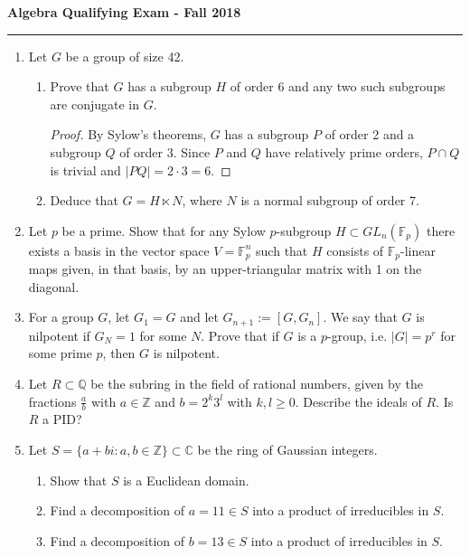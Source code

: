 \documentclass[11pt,letterpaper]{report}
\newcommand{\integers}{\mathbb{Z}}
\newcommand{\complex}{\mathbb{C}}
\newcommand{\rationals}{\mathbb{Q}}
\newcommand{\field}{\mathbb{F}}
\begin{document}
\begin{center}
{\bf \Large Algebra Qualifying Exam - Fall 2018} %
\vspace{0.2cm}
\hrule
\end{center}

\begin{enumerate}
	\item Let $G$ be a group of size 42.
	\begin{enumerate}
		\item Prove that $G$ has a subgroup $H$ of order 6 and any two such subgroups are conjugate in $G$.
		\begin{proof}
			By Sylow's theorems, $G$ has a subgroup $P$ of order 2 and a subgroup $Q$ of order 3. Since $P$ and $Q$ have relatively prime orders, $P\cap Q$ is trivial and $|PQ| = 2\cdot 3 = 6$. 
		\end{proof}
		\item Deduce that $G = H\ltimes N$, where $N$ is a normal subgroup of order 7.
	\end{enumerate}
	\vfill
	\item Let $p$ be a prime. Show that for any Sylow $p$-subgroup $H\subset GL_n(\field_p)$ there exists a basis in the vector space $V= \field_p^n$ such that $H$ consists of $\field_p$-linear maps given, in that basis, by an upper-triangular matrix with 1 on the diagonal.
	\vfill
	\item For a group $G$, let $G_1 = G$ and let $G_{n+1}:= [G, G_n]$. We say that $G$ is nilpotent if $G_N = 1$ for some $N$. Prove that if $G$ is a $p$-group, i.e. $|G| = p^r$ for some prime $p$, then $G$ is nilpotent.
	\vfill
	\item Let $R\subset \rationals$ be the subring in the field of rational numbers, given by the fractions $\frac{a}{b}$ with $a\in \integers$ and $b = 2^k3^l$ with $k,l\geq 0$. Describe the ideals of $R$. Is $R$ a PID?
	\vfill
	\item Let $S = \{a+bi: a,b\in \integers\}\subset \complex$ be the ring of Gaussian integers.
	\begin{enumerate}
		\item Show that $S$ is a Euclidean domain.
		\item Find a decomposition of $a = 11\in S$ into a product of irreducibles in $S$.
		\item Find a decomposition of $b=13\in S$ into a product of irreducibles in $S$. 
	\end{enumerate}

\end{enumerate}
\end{document}
